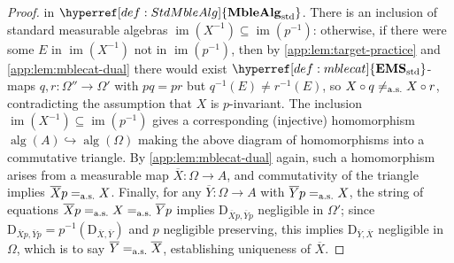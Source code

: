 \documentclass[
  sigconf,
  screen, ]{acmart}
\theoremstyle{definition}
\newcommand\img{\operatorname{im}}
\newcommand\nref[2]{\hyperref[#1]{#2}} \newcommand\checkhigh{{\huge{\color{red}\textbf{TODO: check}}}}
\newcommand\aseq{=_{\rm a.s.}}
\newcommand\neset[2]{\mathrm{D}_{#1,#2}}
\newcommand\texStdMble{\mathbf{EMS}_{\rm std}}
\newcommand\StdMble{{\nref{def:mblecat}{\texStdMble}}}
\newcommand\StdMbleAlg{{\nref{def:StdMbleAlg}{\mathbf{MbleAlg}_{\rm std}}}}
\begin{document}
\begin{proof}
  in $\StdMbleAlg$.
  There is an inclusion of standard measurable algebras $\img(X^{-1})\subseteq \img(p^{-1})$:
  otherwise, if there were some $E$ in $\img(X^{-1})$
  not in $\img(p^{-1})$,
  then by \cref{app:lem:target-practice} and \cref{app:lem:mblecat-dual}
  there would exist $\StdMble$-maps $q,r : \Omega''\to\Omega'$
  with $pq = pr$ but $q^{-1}(E) \ne r^{-1}(E)$,
  so $X\circ q \not\aseq X\circ r$,
  contradicting the assumption that $X$ is $p$-invariant.
  The inclusion $\img(X^{-1})\subseteq \img(p^{-1})$ gives
  a corresponding (injective) homomorphism $\operatorname{alg}(A)\hookrightarrow\operatorname{alg}(\Omega)$
  making the above diagram of homomorphisms into a commutative triangle.
  By \cref{app:lem:mblecat-dual} again, 
  such a homomorphism arises from a measurable map
  $\overline X : \Omega\to A$,
  and commutativity of the triangle implies
  $\overline X p\aseq X$.
  Finally, for any $\overline Y : \Omega\to A$
  with $\overline Y p \aseq X$,
  the string of equations $\overline X p\aseq X \aseq \overline Y p$
  implies
  $\neset{\overline X p}{\overline Y p}$
  negligible in $\Omega'$;
  since $\neset{\overline X p}{\overline Y p} = p^{-1}(\neset{\overline X}{\overline Y})$
  and $p$ negligible preserving,
  this implies $\neset{\overline Y}{\overline X}$ negligible in $\Omega$,
  which is to say $\overline Y\aseq \overline X$,
  establishing uniqueness of $\overline X$.
\end{proof}
\end{document}
